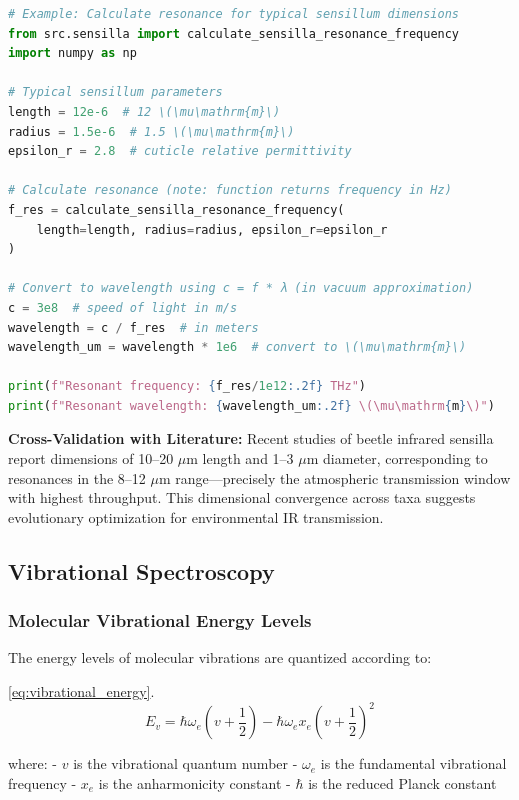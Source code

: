 \documentclass[
  13pt,
  a4paperpaper,
  12pt]{article}
\begin{document}
\begin{lstlisting}[language=Python]
# Example: Calculate resonance for typical sensillum dimensions
from src.sensilla import calculate_sensilla_resonance_frequency
import numpy as np

# Typical sensillum parameters
length = 12e-6  # 12 \(\mu\mathrm{m}\)
radius = 1.5e-6  # 1.5 \(\mu\mathrm{m}\)
epsilon_r = 2.8  # cuticle relative permittivity

# Calculate resonance (note: function returns frequency in Hz)
f_res = calculate_sensilla_resonance_frequency(
    length=length, radius=radius, epsilon_r=epsilon_r
)

# Convert to wavelength using c = f * λ (in vacuum approximation)
c = 3e8  # speed of light in m/s
wavelength = c / f_res  # in meters
wavelength_um = wavelength * 1e6  # convert to \(\mu\mathrm{m}\)

print(f"Resonant frequency: {f_res/1e12:.2f} THz")
print(f"Resonant wavelength: {wavelength_um:.2f} \(\mu\mathrm{m}\)")
\end{lstlisting}

\textbf{Cross-Validation with Literature:} Recent studies of beetle
infrared sensilla report dimensions of 10--20 \(\mu\mathrm{m}\) length
and 1--3 \(\mu\mathrm{m}\) diameter, corresponding to resonances in the
8--12 \(\mu\mathrm{m}\) range---precisely the atmospheric transmission
window with highest throughput. This dimensional convergence across taxa
suggests evolutionary optimization for environmental IR transmission.

\subsection{Vibrational Spectroscopy}\label{vibrational-spectroscopy}

\subsubsection{Molecular Vibrational Energy
Levels}\label{molecular-vibrational-energy-levels}

The energy levels of molecular vibrations are quantized according to:

\eqref{eq:vibrational_energy}. \begin{equation}
E_v = \hbar \omega_e \left(v + \frac{1}{2}\right) - \hbar \omega_e x_e \left(v + \frac{1}{2}\right)^2 \label{eq:vibrational_energy}
\end{equation}

where: - \(v\) is the vibrational quantum number - \(\omega_e\) is the
fundamental vibrational frequency - \(x_e\) is the anharmonicity
constant - \(\hbar\) is the reduced Planck constant
\end{document}
